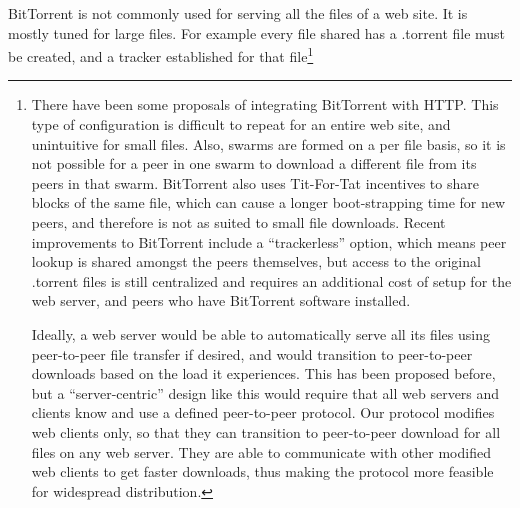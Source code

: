 
BitTorrent is not commonly used for serving all the files of a web site.  It is mostly tuned for large files.  For example every file shared has a .torrent file must be created, and a tracker established for that file\footnote{There have been some proposals of integrating BitTorrent with HTTP.  This type of configuration is difficult to repeat for an entire web site, and unintuitive for small files.  Also, swarms are formed on a per file basis, so it is not possible for a peer in one swarm to download a different file from its peers in that swarm.  BitTorrent also uses Tit-For-Tat incentives to share blocks of the same file, which can cause a longer boot-strapping time for new peers, and therefore is not as suited to small file downloads.  Recent improvements to BitTorrent include a ``trackerless'' option, which means peer lookup is shared amongst the peers themselves, but access to the original .torrent files is still centralized and requires an additional cost of setup for the web server, and peers who have BitTorrent software installed.

Ideally, a web server would be able to automatically serve all its files using peer-to-peer file transfer if desired, and would transition to peer-to-peer downloads based on the load it experiences.  This has been proposed before, but a ``server-centric'' design like this would require that all web servers and clients know and use a defined peer-to-peer protocol.  Our protocol modifies web clients only, so that they can transition to peer-to-peer download for all files on any web server.  They are able to communicate with other modified web clients to get faster downloads, thus making the protocol more feasible for widespread distribution.


}
